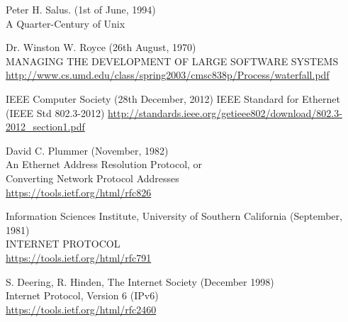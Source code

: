 \documentclass[10pt,a4paper,notitlepage]{report}
\begin{document}
\begin{thebibliography}{99}
    Peter H. Salus. (1st of June, 1994)\\
    A Quarter-Century of Unix

    Dr. Winston W. Royce (26th August, 1970)\\
    MANAGING THE DEVELOPMENT OF LARGE SOFTWARE SYSTEMS\\
    \url{http://www.cs.umd.edu/class/spring2003/cmsc838p/Process/waterfall.pdf}
    
	IEEE Computer Society (28th December, 2012)
	IEEE Standard for Ethernet (IEEE Std 802.3-2012)
	\url{http://standards.ieee.org/getieee802/download/802.3-2012_section1.pdf}
	
	David C. Plummer (November, 1982)\\
	An Ethernet Address Resolution Protocol, or\\
	Converting Network Protocol Addresses\\
	\url{https://tools.ietf.org/html/rfc826}
	
	Information Sciences Institute, University of Southern California (September, 1981)\\
	INTERNET PROTOCOL\\
	\url{https://tools.ietf.org/html/rfc791}
	
	S. Deering, R. Hinden, The Internet Society (December 1998)\\
	Internet Protocol, Version 6 (IPv6)\\
	\url{https://tools.ietf.org/html/rfc2460}

\end{thebibliography}
\end{document}
